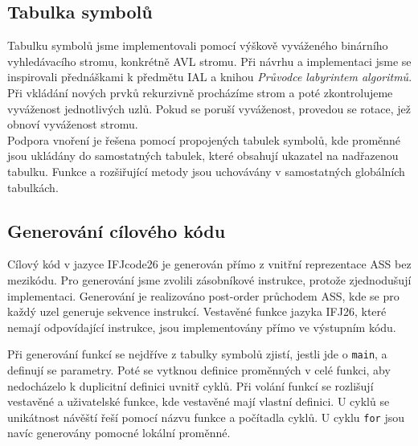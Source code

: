 \documentclass[11pt]{article}
\begin{document}
{  \subsection{Tabulka symbolů}
  Tabulku symbolů jsme implementovali pomocí výškově vyváženého binárního vyhledávacího
  stromu, konkrétně AVL stromu. Při návrhu a implementaci jsme se inspirovali přednáškami
  k předmětu IAL a knihou \textit{Průvodce labyrintem algoritmů}. Při vkládání
  nových prvků rekurzivně procházíme strom a poté zkontrolujeme vyváženost
  jednotlivých uzlů. Pokud se poruší vyváženost, provedou se
  rotace, jež obnoví vyváženost stromu.
  \\
  Podpora vnoření je řešena pomocí propojených tabulek symbolů, kde proměnné jsou ukládány
  do samostatných tabulek, které obsahují ukazatel na nadřazenou tabulku. Funkce a rozšiřující
  metody jsou uchovávány v samostatných globálních tabulkách.

  \subsection{Generování cílového kódu}
  Cílový kód v jazyce IFJcode26 je generován přímo z vnitřní reprezentace ASS bez mezikódu. Pro
  generování jsme zvolili zásobníkové instrukce, protože zjednodušují implementaci. Generování je
  realizováno post-order průchodem ASS, kde se pro každý uzel generuje sekvence instrukcí. Vestavěné
  funkce jazyka IFJ26, které nemají odpovídající instrukce, jsou implementovány přímo ve výstupním
  kódu.

  Při generování funkcí se nejdříve z tabulky symbolů zjistí, jestli jde o \texttt{main}, a definují
  se parametry. Poté se vytknou definice proměnných v celé funkci, aby nedocházelo k duplicitní
  definici uvnitř cyklů. Při volání funkcí se rozlišují vestavěné a uživatelské funkce, kde
  vestavěné mají vlastní definici. U cyklů se unikátnost návěští řeší pomocí názvu funkce a počítadla
  cyklů. U cyklu \texttt{for} jsou navíc generovány pomocné lokální proměnné.
 }

\newpage
\end{document}
